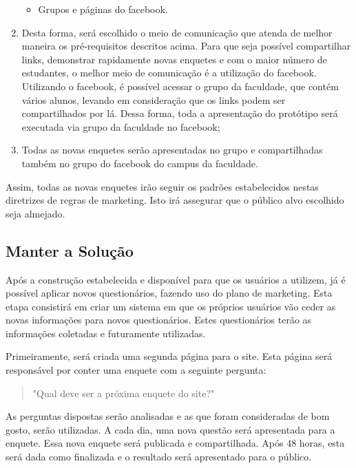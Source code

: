 \begin{enumerate}
\begin{itemize}
            \item Grupos e páginas do facebook.
        \end{itemize}
    \item Desta forma, será escolhido o meio de comunicação que atenda de melhor maneira os pré-requisitos descritos acima. Para que
        seja possível compartilhar links, demonstrar rapidamente novas enquetes e com o maior número de estudantes, o melhor meio de
        comunicação é a utilização do facebook. Utilizando o facebook, é possível acessar o grupo da faculdade, que contém vários alunos,
        levando em consideração que os links podem ser compartilhados por lá. Dessa forma, toda a apresentação do protótipo será executada
        via grupo da faculdade no facebook;
    \item Todas as novas enquetes serão apresentadas no grupo e compartilhadas também no grupo do facebook do campus da faculdade.
\end{enumerate}

Assim, todas as novas enquetes irão seguir os padrões estabelecidos nestas diretrizes de regras de marketing. Isto irá assegurar que
o público alvo escolhido seja almejado.


\subsection{Manter a Solução}
\label{sub:definir_tecnologia}
Após a construção estabelecida e disponível para que os usuários a utilizem, já é possível aplicar novos questionários, fazendo uso do plano de marketing.
Esta etapa consistirá em criar um sistema em que os próprios usuários vão ceder as novas informações para novos questionários. Estes questionários 
terão as informações coletadas e futuramente utilizadas.

Primeiramente, será criada uma segunda página para o site. Esta página será responsável por conter uma enquete com a seguinte pergunta:

 \begin{quote}
     "Qual deve ser a próxima enquete do site?"
 \end{quote}

As perguntas dispostas serão analisadas e as que foram consideradas de bom gosto, serão utilizadas. A cada dia, uma nova questão será apresentada
para a enquete. Essa nova enquete será publicada e compartilhada. Após 48 horas, esta será dada como finalizada e o resultado será apresentado
para o público. 

